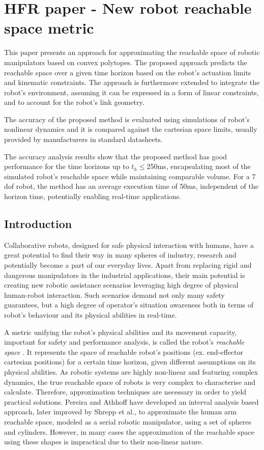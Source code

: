 
\chapter{HFR paper - New robot reachable space metric}
\label{ch:hfr}

This paper presents an approach for approximating the reachable space of robotic manipulators based on convex polytopes. The proposed approach predicts the reachable space over a given time horizon based on the robot's actuation limits and kinematic constraints. The approach is furthermore extended to integrate the robot's environment, assuming it can be expressed in a form of linear constraints, and to account for the robot's link geometry.

The accuracy of the proposed method is evaluated using simulations of robot's nonlinear dynamics and it is compared against the cartesian space limits, usually provided by manufacturers in standard datasheets.

The accuracy analysis results show that the proposed method has good performance for the time horizons up to $t_h\!\leq$250ms, encapsulating most of the simulated robot's reachable space while maintaining comparable volume. For a 7 dof robot, the method has an average execution time of 50ms, independent of the horizon time, potentially enabling real-time applications.

\section{Introduction}


Collaborative robots, designed for safe physical interaction with humans, have a great potential to find their way in many spheres of industry, research and potentially become a part of our everyday lives. Apart from replacing rigid and dangerous manipulators in the industrial applications, their main potential is creating new robotic assistance scenarios leveraging high degree of physical human-robot interaction. Such scenarios demand not only many safety guarantees, but a high degree of operator's situation awareness both in terms of robot's behaviour and its physical abilities in real-time.  

A metric unifying the robot's physical abilities and its movement capacity, important for safety and performance analysis, is called the robot's \textit{reachable space} \cite{althoff2014}. It represents the space of reachable robot's positions (ex. end-effector cartesian positions) for a certain time horizon, given different assumptions on its physical abilities. As robotic systems are highly non-linear and featuring complex dynamics, the true reachable space of robots is very complex to characterise and calculate. Therefore, approximation techniques are necessary in order to yield practical solutions. Pereira and Athhoff\cite{pereira2017} have developed an interval analysis based approach, later improved by Shrepp et al.\cite{schepp2022}, to approximate the human arm reachable space, modeled as a serial robotic manipulator, using a set of spheres and cylinders. However, in many cases the approximation of the reachable space using these shapes is impractical due to their non-linear nature.

